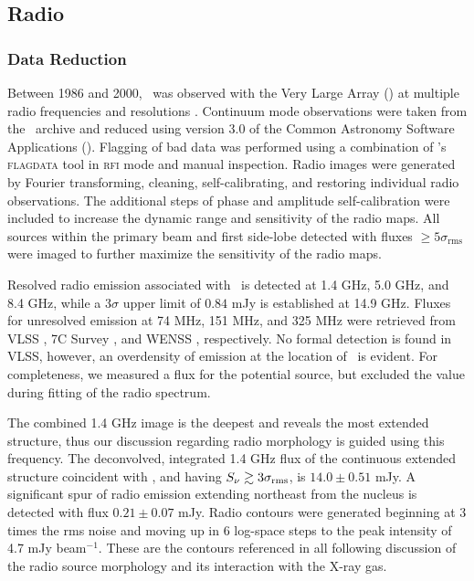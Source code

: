 \documentclass[useAMS,usenatbib]{mn2e}
\begin{document}
\subsection{Radio}
\label{sec:radio}

\subsubsection{Data Reduction}

Between 1986 and 2000, \irs\ was observed with the Very Large Array
(\vla) at multiple radio frequencies and resolutions \citep[see
  also][for 1.4 and 5 GHz analysis; hereafter
  H93]{1993ApJ...415...82H}. Continuum mode observations were taken
from the \vla\ archive and reduced using version 3.0 of the Common
Astronomy Software Applications (\casa). Flagging of bad data was
performed using a combination of \casa's {\textsc{flagdata}} tool in
{\textsc{rfi}} mode and manual inspection. Radio images were generated
by Fourier transforming, cleaning, self-calibrating, and restoring
individual radio observations. The additional steps of phase and
amplitude self-calibration were included to increase the dynamic range
and sensitivity of the radio maps. All sources within the primary beam
and first side-lobe detected with fluxes $\ge 5\sigma_{\mathrm{rms}}$
were imaged to further maximize the sensitivity of the radio maps.

Resolved radio emission associated with \irs\ is detected at 1.4 GHz,
5.0 GHz, and 8.4 GHz, while a $3\sigma$ upper limit of $0.84$ mJy is
established at 14.9 GHz. Fluxes for unresolved emission at 74 MHz, 151
MHz, and 325 MHz were retrieved from VLSS \citep{vlss}, 7C Survey
\citep{1999MNRAS.306...31R}, and WENSS \citep{1997A&AS..124..259R},
respectively. No formal detection is found in VLSS, however, an
overdensity of emission at the location of \irs\ is evident. For
completeness, we measured a flux for the potential source, but
excluded the value during fitting of the radio spectrum.

The combined 1.4 GHz image is the deepest and reveals the most
extended structure, thus our discussion regarding radio morphology is
guided using this frequency. The deconvolved, integrated 1.4 GHz flux
of the continuous extended structure coincident with \irs, and having
$S_{\nu} \gtrsim 3\sigma_{\mathrm{rms}}$, is $14.0 \pm 0.51$ mJy. A
significant spur of radio emission extending northeast from the
nucleus is detected with flux $0.21 \pm 0.07$ mJy. Radio contours were
generated beginning at 3 times the rms noise and moving up in 6
log-space steps to the peak intensity of 4.7 mJy beam$^{-1}$. These
are the contours referenced in all following discussion of the radio
source morphology and its interaction with the X-ray gas.
\end{document}
